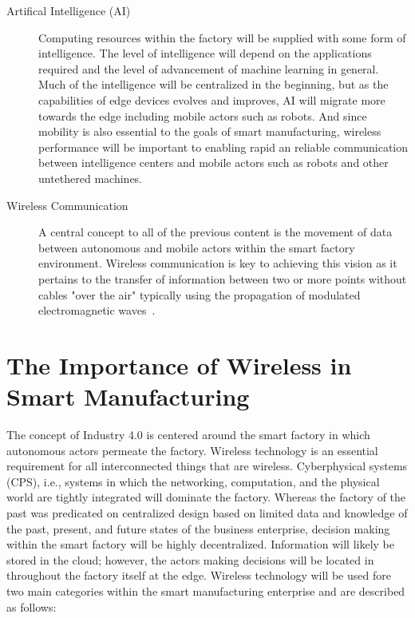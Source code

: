 {\begin{description}
	\item[Artifical Intelligence (AI)] Computing resources within the factory will be supplied with some form of intelligence.  The level of intelligence will depend on the applications required and the level of advancement of machine learning in general.  Much of the intelligence will be centralized in the beginning, but as the capabilities of edge devices evolves and improves, AI will migrate more towards the edge including mobile actors such as robots.   And since mobility is also essential to the goals of smart manufacturing, wireless performance will be important to enabling rapid an reliable communication between intelligence centers and mobile actors such as robots and other untethered machines.
	
	\item[Wireless Communication] A central concept to all of the previous content is the movement of data between autonomous and mobile actors within the smart factory environment.  Wireless communication is key to achieving this vision as it pertains to the transfer of information between two or more points without cables "over the air" typically using the propagation of modulated electromagnetic waves~\cite{proakis1995digital}.


\end{description}



\section{The Importance of Wireless in Smart Manufacturing}
The concept of Industry 4.0 is centered around the smart factory in which autonomous actors permeate the factory.  Wireless technology is an essential requirement for all interconnected things that are wireless. Cyberphysical systems (CPS), i.e., systems in which the networking, computation, and the physical world are tightly integrated will dominate the factory.  Whereas the factory of the past was predicated on centralized design based on limited data and knowledge of the past, present, and future states of the business enterprise, decision making within the smart factory will be highly decentralized.  Information will likely be stored in the cloud; however, the actors making decisions will be located in throughout the factory itself at the edge.  Wireless technology will be used fore two main categories within the smart manufacturing enterprise and are described as follows:

\begin{description}
	

\end{description}}
